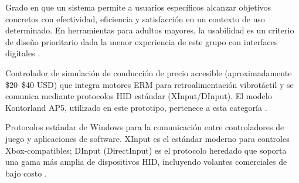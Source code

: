\begin{description}[leftmargin=0pt, labelwidth=\textwidth, 
                    labelsep=0pt, style=nextline]
\item[\textbf{Usabilidad}]
Grado en que un sistema permite a usuarios específicos alcanzar objetivos 
concretos con efectividad, eficiencia y satisfacción en un contexto de uso 
determinado. En herramientas para adultos mayores, la usabilidad es un 
criterio de diseño prioritario dada la menor experiencia de este grupo con 
interfaces digitales \parencite{Peres2022SUS, Ortega2024}.

\item[\textbf{Volante háptico de bajo costo}]
Controlador de simulación de conducción de precio accesible (aproximadamente 
\$20--\$40 USD) que integra motores ERM para retroalimentación vibrotáctil 
y se comunica mediante protocolos HID estándar (XInput/DInput). El modelo 
Kontorland AP5, utilizado en este prototipo, pertenece a esta categoría 
\parencite{Adilkhanov2022, Gardinger2024}.

\item[\textbf{XInput / DInput}]
Protocolos estándar de Windows para la comunicación entre controladores 
de juego y aplicaciones de software. XInput es el estándar moderno para 
controles Xbox-compatibles; DInput (DirectInput) es el protocolo heredado 
que soporta una gama más amplia de dispositivos HID, incluyendo volantes 
comerciales de bajo costo \parencite{Adilkhanov2022}.

\end{description}